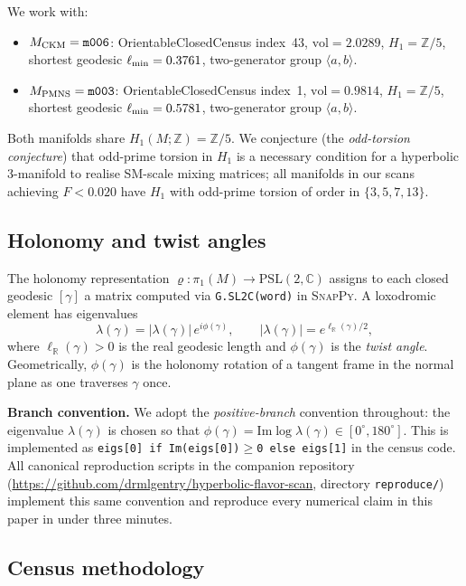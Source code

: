 \documentclass[11pt,a4paper]{article}
\newcommand{\PSL}{\mathrm{PSL}(2,\mathbb{C})}
\newcommand{\pioneM}{\pi_1(M)}
\newcommand{\mfld}[1]{\texttt{#1}}
\newcommand{\degr}{^{\circ}}
\begin{document}
We work with:
\begin{itemize}
\item $M_{\rm CKM} = \mfld{m006}$: OrientableClosedCensus index~43,
      $\mathrm{vol}=2.0289$, $H_1=\mathbb{Z}/5$,
      shortest geodesic $\ell_{\rm min}=0.3761$,
      two-generator group $\langle a,b\rangle$.
\item $M_{\rm PMNS} = \mfld{m003}$: OrientableClosedCensus index~1,
      $\mathrm{vol}=0.9814$, $H_1=\mathbb{Z}/5$,
      shortest geodesic $\ell_{\rm min}=0.5781$,
      two-generator group $\langle a,b\rangle$.
\end{itemize}
Both manifolds share $H_1(M;\mathbb{Z})=\mathbb{Z}/5$.
We conjecture (the \emph{odd-torsion conjecture}) that odd-prime torsion
in $H_1$ is a necessary condition for a hyperbolic 3-manifold to realise
SM-scale mixing matrices; all manifolds in our scans achieving $F<0.020$
have $H_1$ with odd-prime torsion of order in $\{3,5,7,13\}$.

\subsection{Holonomy and twist angles}

The holonomy representation $\varrho:\pioneM\to\PSL$ assigns to each closed
geodesic $[\gamma]$ a matrix computed via \texttt{G.SL2C(word)} in \textsc{SnapPy}.
A loxodromic element has eigenvalues
\begin{equation}
  \lambda(\gamma) = |\lambda(\gamma)|\,e^{i\phi(\gamma)},\qquad
  |\lambda(\gamma)| = e^{\ell_{\mathbb{R}}(\gamma)/2},
  \label{eq:eigenvalue}
\end{equation}
where $\ell_{\mathbb{R}}(\gamma)>0$ is the real geodesic length and
$\phi(\gamma)$ is the \emph{twist angle}.
Geometrically, $\phi(\gamma)$ is the holonomy rotation of a tangent frame
in the normal plane as one traverses $\gamma$ once.

\textbf{Branch convention.}
We adopt the \emph{positive-branch} convention throughout:
the eigenvalue $\lambda(\gamma)$ is chosen so that
$\phi(\gamma)=\mathrm{Im}\log\lambda(\gamma)\in[0\degr,180\degr]$.
This is implemented as \texttt{eigs[0] if Im(eigs[0])$\geq$0 else eigs[1]}
in the census code.
All canonical reproduction scripts in the companion repository
(\url{https://github.com/drmlgentry/hyperbolic-flavor-scan},
directory \texttt{reproduce/}) implement this same convention and
reproduce every numerical claim in this paper in under three minutes.

\subsection{Census methodology}
\end{document}
